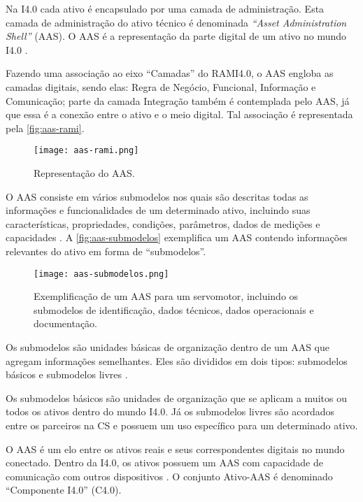 Na I4.0 cada ativo é encapsulado por uma camada de administração. Esta camada de administração do ativo técnico é denominada \textit{``Asset Administration Shell''} (AAS). O AAS é a representação da parte digital de um ativo no mundo I4.0 \cite{ye2019aas}.

Fazendo uma associação ao eixo ``Camadas'' do RAMI4.0, o AAS engloba as camadas digitais, sendo elas: Regra de Negócio, Funcional, Informação e Comunicação; parte da camada Integração também é contemplada pelo AAS, já que essa é a conexão entre o ativo e o meio digital. Tal associação é representada pela \autoref{fig:aas-rami}.

\begin{figure}[htb]
	\centering
	\texttt{[image: aas-rami.png]}
	\caption{Representação do AAS.}
	\label{fig:aas-rami}
\end{figure}

O AAS consiste em vários submodelos nos quais são descritas todas as informações e funcionalidades de um determinado ativo, incluindo suas características, propriedades, condições, parâmetros, dados de medições e capacidades \cite{bader2019aas}. A \autoref{fig:aas-submodelos} exemplifica um AAS contendo informações relevantes do ativo em forma de ``submodelos''.

\begin{figure}[htb]
	\centering
	\texttt{[image: aas-submodelos.png]}
	\caption{Exemplificação de um AAS para um servomotor, incluindo os submodelos de identificação, dados técnicos, dados operacionais e documentação.}
	\label{fig:aas-submodelos}
\end{figure}

Os submodelos são unidades básicas de organização dentro de um AAS que agregam informações semelhantes. Eles são divididos em dois tipos: submodelos básicos e submodelos livres \cite{bader2019aasimplementation}.

Os submodelos básicos são unidades de organização que se aplicam a muitos ou todos os ativos dentro do mundo I4.0. Já os submodelos livres são acordados entre os parceiros na CS e possuem um uso específico para um determinado ativo.

O AAS é um elo entre os ativos reais e seus correspondentes digitais no mundo conectado. Dentro da I4.0, os ativos possuem um AAS com capacidade de comunicação com outros dispositivos \cite{bader2019aas}. O conjunto Ativo-AAS é denominado ``Componente I4.0'' (C4.0).%

